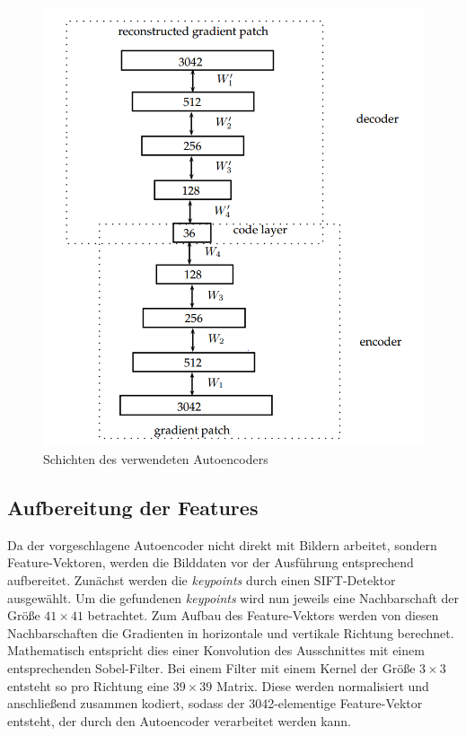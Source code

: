 \begin{figure}
	\centering
	\includegraphics[scale=0.6]{images/ae_model.png}
	\caption{Schichten des verwendeten Autoencoders \cite{aed2016}}
	\label{img:ae_model}
\end{figure}

\subsection{Aufbereitung der Features}

Da der vorgeschlagene Autoencoder nicht direkt mit Bildern arbeitet, sondern Feature-Vektoren, werden die Bilddaten vor der Ausführung entsprechend aufbereitet. Zunächst werden die \textit{keypoints} durch einen SIFT-Detektor ausgewählt. Um die gefundenen \textit{keypoints} wird nun jeweils eine Nachbarschaft der Größe $41 \times 41$ betrachtet. Zum Aufbau des Feature-Vektors werden von diesen Nachbarschaften die Gradienten in horizontale und vertikale Richtung berechnet. Mathematisch entspricht dies einer Konvolution des Ausschnittes mit einem entsprechenden Sobel-Filter. Bei einem Filter mit einem Kernel der Größe $3 \times 3$ entsteht so pro Richtung eine $39 \times 39$ Matrix. Diese werden normalisiert und anschließend zusammen kodiert, sodass der 3042-elementige Feature-Vektor entsteht, der durch den Autoencoder verarbeitet werden kann.

